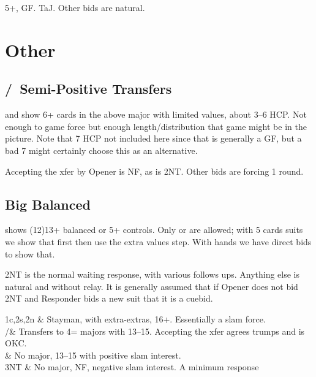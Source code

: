 \documentclass[main]{subfile}
\begin{document}
	5+\ddd, GF.  TaJ. Other bids are natural.
	
	\section{Other}
	
	\subsection{/\hhh ~Semi-Positive Transfers}	
		 and  show 6+ cards in the above major with limited values, about 3--6 HCP.  Not enough to game force but enough length/distribution that game might be in the picture.  Note that 7 HCP not included here since that is generally a GF, but a bad 7 might certainly choose this as an alternative.
		
		Accepting the xfer by Opener is NF, as is 2NT.  Other bids are forcing 1 round.
		
	\subsection{ Big Balanced}
	
	 shows (12)13+ balanced or 5+ controls.  Only  or  are allowed; with 5 cards suits we show that first then use the extra values step.  With  hands we have direct bids to show that.
		
	2NT is the normal waiting response, with various follows ups.  Anything else is natural and without relay.  It is generally assumed that if Opener does not bid 2NT and Responder bids a new suit that it is a cuebid.
	
	\begin{bidtable}{1c,2s,2n}
		 & Stayman, with extra-extras, 16+.  Essentially a slam force. \\
		/\hhh& Transfers to 4= majors with 13--15. Accepting the xfer agrees trumps and is OKC. \\
		 & No major, 13--15 with positive slam interest. \\
		3NT & No major, NF, negative slam interest.  A minimum  response \\
	\end{bidtable}	

	
\end{document}
